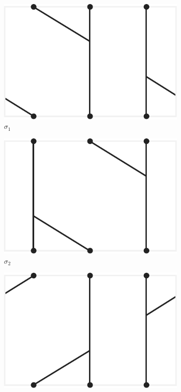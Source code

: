 \documentclass[12pt,twoside]{reedthesis}
\theoremstyle{definition}
\begin{document}
\begin{figure}[h]
  \centering
  \begin{subfigure}[t]{0.23\textwidth}
    \centering
    \includegraphics[width=\textwidth]{figures/braid_gen_a.pdf}
    \caption{$\sigma_1$}
  \end{subfigure}
  \hfill
  \begin{subfigure}[t]{0.23\textwidth}
    \centering
    \includegraphics[width=\textwidth]{figures/braid_gen_b.pdf}
    \caption{$\sigma_2$}
  \end{subfigure}
  \begin{subfigure}[t]{0.23\textwidth}
    \centering
    \includegraphics[width=\textwidth]{figures/braid_gen_a_inv.pdf}

\end{subfigure}
\end{figure}
\end{document}
